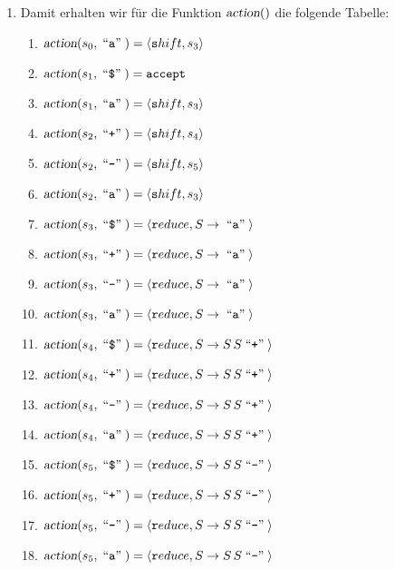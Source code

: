 \documentclass{article}
\def\pair(#1,#2){\langle #1, #2 \rangle}
\newcommand{\quoted}[1]{\;\mbox{``\texttt{#1}''}\;}
\begin{document}
\begin{enumerate}
\item Damit erhalten wir f\"ur die Funktion $\textsl{action}()$ die folgende Tabelle:
      \begin{enumerate}
      \item $\textsl{action}(s_0, \quoted{a}) = \pair(\texttt{shift}, s_3)$
      \item $\textsl{action}(s_1, \quoted{\symbol{36}}) = \mathtt{accept}$
      \item $\textsl{action}(s_1, \quoted{a}) = \pair(\texttt{shift}, s_3)$
      \item $\textsl{action}(s_2, \quoted{+}) = \pair(\texttt{shift}, s_4)$
      \item $\textsl{action}(s_2, \quoted{-}) = \pair(\texttt{shift}, s_5)$
      \item $\textsl{action}(s_2, \quoted{a}) = \pair(\texttt{shift}, s_3)$
      \item $\textsl{action}(s_3, \quoted{\symbol{36}}) = \pair(\texttt{reduce}, S \rightarrow \quoted{a})$
      \item $\textsl{action}(s_3, \quoted{+}) = \pair(\texttt{reduce}, S \rightarrow \quoted{a})$
      \item $\textsl{action}(s_3, \quoted{-}) = \pair(\texttt{reduce}, S \rightarrow \quoted{a})$
      \item $\textsl{action}(s_3, \quoted{a}) = \pair(\texttt{reduce}, S \rightarrow \quoted{a})$
      \item $\textsl{action}(s_4, \quoted{\symbol{36}}) = \pair(\texttt{reduce}, S \rightarrow S\, S \quoted{+})$
      \item $\textsl{action}(s_4, \quoted{+}) = \pair(\texttt{reduce}, S \rightarrow S\, S \quoted{+})$
      \item $\textsl{action}(s_4, \quoted{-}) = \pair(\texttt{reduce}, S \rightarrow S\, S \quoted{+})$
      \item $\textsl{action}(s_4, \quoted{a}) = \pair(\texttt{reduce}, S \rightarrow S\, S \quoted{+})$
      \item $\textsl{action}(s_5, \quoted{\symbol{36}}) = \pair(\texttt{reduce}, S \rightarrow S\, S \quoted{-})$
      \item $\textsl{action}(s_5, \quoted{+}) = \pair(\texttt{reduce}, S \rightarrow S\, S \quoted{-})$
      \item $\textsl{action}(s_5, \quoted{-}) = \pair(\texttt{reduce}, S \rightarrow S\, S \quoted{-})$
      \item $\textsl{action}(s_5, \quoted{a}) = \pair(\texttt{reduce}, S \rightarrow S\, S \quoted{-})$

\end{enumerate}
\end{enumerate}
\end{document}
